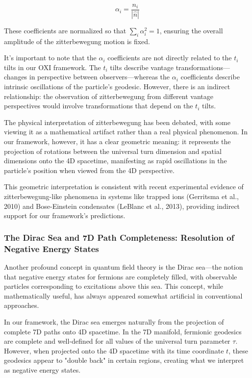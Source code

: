 \documentclass{article}
\begin{document}
\begin{equation}
\alpha_i = \frac{n_i}{|\hat{n}|}
\end{equation}

These coefficients are normalized so that $\sum_i \alpha_i^2 = 1$, ensuring the overall amplitude of the zitterbewegung motion is fixed.

It's important to note that the $\alpha_i$ coefficients are not directly related to the $t_i$ tilts in our OXI framework. The $t_i$ tilts describe vantage transformations—changes in perspective between observers—whereas the $\alpha_i$ coefficients describe intrinsic oscillations of the particle's geodesic. However, there is an indirect relationship: the observation of zitterbewegung from different vantage perspectives would involve transformations that depend on the $t_i$ tilts.

The physical interpretation of zitterbewegung has been debated, with some viewing it as a mathematical artifact rather than a real physical phenomenon. In our framework, however, it has a clear geometric meaning: it represents the projection of rotations between the universal turn dimension and spatial dimensions onto the 4D spacetime, manifesting as rapid oscillations in the particle's position when viewed from the 4D perspective.

This geometric interpretation is consistent with recent experimental evidence of zitterbewegung-like phenomena in systems like trapped ions (Gerritsma et al., 2010) and Bose-Einstein condensates (LeBlanc et al., 2013), providing indirect support for our framework's predictions.

\subsubsection{The Dirac Sea and 7D Path Completeness: Resolution of Negative Energy States}

Another profound concept in quantum field theory is the Dirac sea—the notion that negative energy states for fermions are completely filled, with observable particles corresponding to excitations above this sea. This concept, while mathematically useful, has always appeared somewhat artificial in conventional approaches.

In our framework, the Dirac sea emerges naturally from the projection of complete 7D paths onto 4D spacetime. In the 7D manifold, fermionic geodesics are complete and well-defined for all values of the universal turn parameter $\tau$. However, when projected onto the 4D spacetime with its time coordinate $t$, these geodesics appear to "double back" in certain regions, creating what we interpret as negative energy states.
\end{document}
